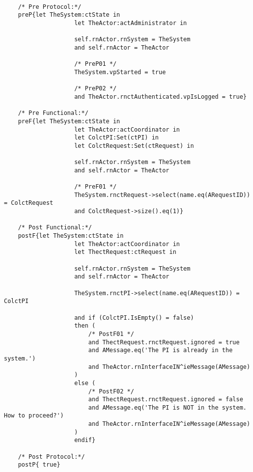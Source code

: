 	\scriptsize
	\vspace{0.5cm}
	\begin{lstlisting}[style=MessirStyle,firstnumber=auto,captionpos=b,caption={\msrmessir (MCL-oriented) specification of the operation \emph{oeCheckAvailability}.},label=OM-actCoordinator-oeCheckAvailability-MCL-LST]

	/* Pre Protocol:*/ 
	preP{let TheSystem:ctState in
					let TheActor:actAdministrator in
					
					self.rnActor.rnSystem = TheSystem
					and self.rnActor = TheActor
					
					/* PreP01 */
					TheSystem.vpStarted = true
					
					/* PreP02 */
					and TheActor.rnctAuthenticated.vpIsLogged = true}
	
	/* Pre Functional:*/
	preF{let TheSystem:ctState in
					let TheActor:actCoordinator in
					let ColctPI:Set(ctPI) in
					let ColctRequest:Set(ctRequest) in
					
					self.rnActor.rnSystem = TheSystem
					and self.rnActor = TheActor
					
					/* PreF01 */
					TheSystem.rnctRequest->select(name.eq(ARequestID)) = ColctRequest
					and ColctRequest->size().eq(1)}
	
	/* Post Functional:*/ 
	postF{let TheSystem:ctState in
					let TheActor:actCoordinator in
					let ThectRequest:ctRequest in
					
					self.rnActor.rnSystem = TheSystem
					and self.rnActor = TheActor
					
					TheSystem.rnctPI->select(name.eq(ARequestID)) = ColctPI
					
					and if (ColctPI.IsEmpty() = false)
					then (
						/* PostF01 */
						and ThectRequest.rnctRequest.ignored = true
						and AMessage.eq('The PI is already in the system.')
						and TheActor.rnInterfaceIN^ieMessage(AMessage)
					)
					else (
						/* PostF02 */
						and ThectRequest.rnctRequest.ignored = false
						and AMessage.eq('The PI is NOT in the system. How to proceed?')
						and TheActor.rnInterfaceIN^ieMessage(AMessage)
					)
					endif}
	
	/* Post Protocol:*/ 
	postP{ true}
	
	\end{lstlisting}
	\normalsize 
	
	
	
	





